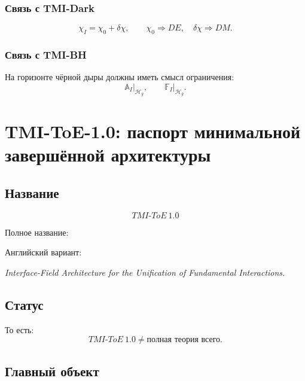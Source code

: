 \documentclass[12pt,a4paper]{article}
\begin{document}
\subsubsection*{Связь с TMI-Dark}
\[
\boxed{\chi_I=\chi_0+\delta\chi},\qquad
\boxed{\chi_0\Rightarrow DE,\quad \delta\chi\Rightarrow DM}.
\]

\subsubsection*{Связь с TMI-BH}
На горизонте чёрной дыры должны иметь смысл ограничения:
\[
\boxed{\mathbb A_I|_{\mathcal H_g}},\qquad
\boxed{\mathbb F_I|_{\mathcal H_g}}.
\]

\section{TMI-ToE-1.0: паспорт минимальной завершённой архитектуры}

\subsection{Название}

\[
\boxed{TMI\mbox{-}ToE\ 1.0}
\]

Полное название:
\begin{center}
\end{center}

Английский вариант:
\begin{center}
\textit{Interface-Field Architecture for the Unification of Fundamental Interactions.}
\end{center}

\subsection{Статус}

\begin{center}
\end{center}

То есть:
\[
\boxed{TMI\mbox{-}ToE\ 1.0\neq\text{полная теория всего}}.
\]

\subsection{Главный объект}
\end{document}
